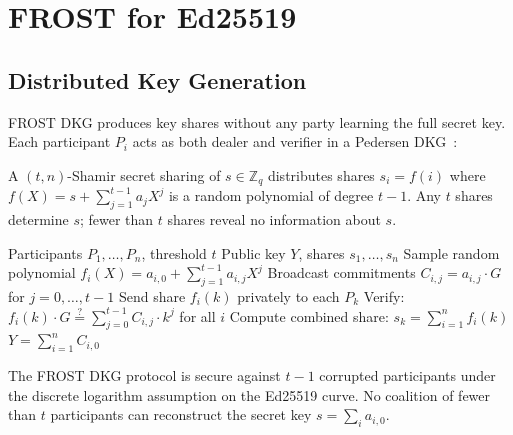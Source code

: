 \section{FROST for Ed25519}

\label{sec:frost}

\subsection{Distributed Key Generation}

FROST DKG produces key shares without any party learning the full secret key.
Each participant $P_i$ acts as both dealer and verifier in a Pedersen
DKG~\cite{pedersen1991}:

\begin{definition}
A $(t, n)$-Shamir secret sharing of $s \in \mathbb{Z}_q$ distributes shares
$s_i = f(i)$ where $f(X) = s + \sum_{j=1}^{t-1} a_j X^j$ is a random
polynomial of degree $t-1$. Any $t$ shares determine $s$; fewer than $t$
shares reveal no information about $s$.
\end{definition}

\begin{algorithm}
\caption{FROST Distributed Key Generation}
\label{alg:dkg}
\begin{algorithmic}[1]
\Require Participants $P_1, \ldots, P_n$, threshold $t$
\Ensure Public key $Y$, shares $s_1, \ldots, s_n$
    \State Sample random polynomial $f_i(X) = a_{i,0} + \sum_{j=1}^{t-1} a_{i,j} X^j$
    \State Broadcast commitments $C_{i,j} = a_{i,j} \cdot G$ for $j = 0, \ldots, t-1$
    \State Send share $f_i(k)$ privately to each $P_k$
\EndFor
{}
    \State Verify: $f_i(k) \cdot G \stackrel{?}{=} \sum_{j=0}^{t-1} C_{i,j} \cdot k^j$ for all $i$
    \State Compute combined share: $s_k = \sum_{i=1}^{n} f_i(k)$
\EndFor
\State $Y = \sum_{i=1}^{n} C_{i,0}$ 
\end{algorithmic}
\end{algorithm}

\begin{theorem}
The FROST DKG protocol is secure against $t-1$ corrupted participants under
the discrete logarithm assumption on the Ed25519 curve. No coalition of fewer
than $t$ participants can reconstruct the secret key $s = \sum_i a_{i,0}$.
\end{theorem}

